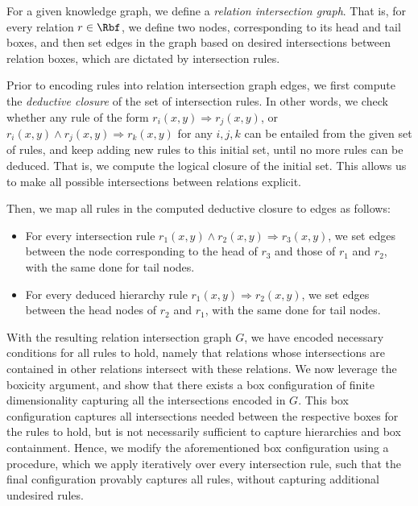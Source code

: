 \documentclass{article}
\begin{document}
For a given knowledge graph, we define a \emph{relation intersection graph}. That is, for every relation $r \in \Rbf$, we define two nodes,  corresponding to its head and tail boxes, and then set edges in the graph based on desired intersections between relation boxes, which are dictated by intersection rules. 

Prior to encoding rules into relation intersection graph edges, we first compute the \emph{deductive closure} of the set of intersection rules. In other words, we check whether any rule of the form $r_i(x,y) \Rightarrow r_j(x,y)$, or $r_i(x,y) \land r_j(x,y) \Rightarrow r_k(x,y)$ for any $i,j,k$ can be entailed from the given set of rules, and keep adding new rules to this initial set, until no more rules can be deduced. That is, we compute the logical closure of the initial set. This allows us to make all possible intersections between relations explicit.

Then, we map all rules in the computed deductive closure to edges as follows: 
\begin{itemize}
\item For every intersection rule $r_1(x,y) \land r_2(x,y) \Rightarrow r_3(x,y)$, we set edges between the node corresponding to the head of $r_3$ and those of $r_1$ and $r_2$, with the same done for tail nodes. 
\item For every deduced hierarchy rule $r_1(x,y) \Rightarrow r_2(x,y)$, we set edges between the head nodes of $r_2$ and $r_1$, with the same done for tail nodes.
\end{itemize}

With the resulting relation intersection graph $G$, we have encoded necessary conditions for all rules to hold, namely that relations whose intersections are contained in other relations intersect with these relations. We now leverage the boxicity argument, and show that there exists a box configuration of finite dimensionality capturing all the intersections encoded in $G$. This box configuration captures all intersections needed between the respective boxes for the rules to hold, but is not necessarily sufficient to capture hierarchies and box containment. Hence, we modify the aforementioned box configuration using a procedure, which we apply iteratively over every intersection rule, such that the final configuration provably captures all rules, without capturing additional undesired rules. 
\end{document}
